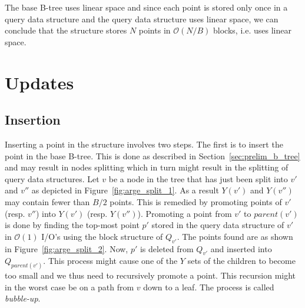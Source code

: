 \documentclass[twoside,11pt,openright]{report}
\begin{document}
The base B-tree uses linear space and since each point is stored only once in a query data structure and the query data structure uses linear space, we can conclude that the structure stores $N$ points in $\mathcal{O}(N/B)$ blocks, i.e. uses linear space.

\section{Updates}
\label{sec:arge_updates}
\subsection{Insertion}
Inserting a point in the structure involves two steps. The first is to insert the point in the base B-tree. This is done as described in Section~\ref{sec:prelim_b_tree} and may result in nodes splitting which in turn might result in the splitting of query data structures. Let $v$ be a node in the tree that has just been split into $v'$ and $v''$ as depicted in Figure~\ref{fig:arge_split_1}. As a result $Y(v')$ and $Y(v'')$ may contain fewer than $B/2$ points. This is remedied by promoting points of $v'$ (resp. $v''$) into $Y(v')$ (resp. $Y(v'')$). Promoting a point from $v'$ to $parent(v')$ is done by finding the top-most point $p'$ stored in the query data structure of $v'$ in $\mathcal{O}(1)$ I/O's using the block structure of $Q_{v'}$. The points found are as shown in Figure~\ref{fig:arge_split_2}. Now, $p'$ is deleted from $Q_{v'}$ and inserted into $Q_{parent(v')}$. This process might cause one of the $Y$ sets of the children to become too small and we thus need to recursively promote a point. This recursion might in the worst case be on a path from $v$ down to a leaf. The process is called \textit{bubble-up}.
\end{document}
